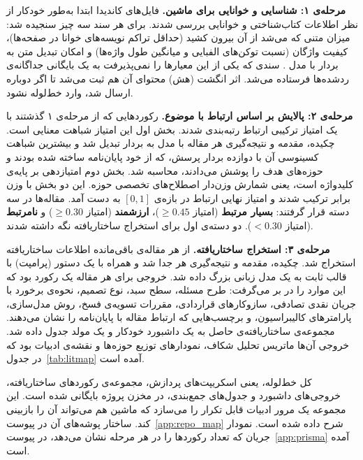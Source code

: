 \medskip
\textbf{مرحله‌ی ۱: شناسایی و خوانایی برای ماشین.}\;
فایل‌های  کاندیدا ابتدا به‌طور خودکار از نظر اطلاعات
کتاب‌شناختی و خوانایی بررسی شدند.
برای هر سند سه چیز سنجیده شد: میزان متنی که می‌شد از آن بیرون کشید
(حداقل تراکم نویسه‌های خوانا در صفحه‌ها)، کیفیت واژگان (نسبت
توکن‌های الفبایی و میانگین طول واژه‌ها) و امکان تبدیل متن به بردار
با مدل .
سندی که یکی از این معیارها را نمی‌پذیرفت به یک بایگانی جداگانه‌ی
ردشده‌ها فرستاده می‌شد. اثر انگشت (هش) محتوای آن هم ثبت می‌شد تا
اگر دوباره ارسال شد، وارد خط‌لوله نشود.

\medskip
\textbf{مرحله‌ی ۲: پالایش بر اساس ارتباط با موضوع.}\;
رکوردهایی که از مرحله‌ی ۱ گذشتند با یک امتیاز ترکیبی ارتباط
رتبه‌بندی شدند.
بخش اول این امتیاز شباهت معنایی است. چکیده، مقدمه و نتیجه‌گیری هر
مقاله با مدل  به بردار تبدیل شد و
بیشترین شباهت کسینوسی آن با دوازده بردار پرسش، که از خود پایان‌نامه
ساخته شده بودند و حوزه‌های هدف را پوشش می‌دادند، محاسبه شد.
بخش دوم امتیازدهی بر پایه‌ی کلیدواژه است، یعنی شمارش وزن‌دار
اصطلاح‌های تخصصی حوزه.
این دو بخش با وزن برابر ترکیب شدند و امتیاز نهایی ارتباط در بازه‌ی
$[0,1]$ به دست آمد.
مقاله‌ها در سه دسته قرار گرفتند: \textbf{بسیار مرتبط} (امتیاز
$\geq 0.45$)، \textbf{ارزشمند} (امتیاز $\geq 0.30$) و \textbf{نامرتبط}
(امتیاز $< 0.30$). دو دسته‌ی اول برای استخراج ساختاریافته نگه داشته
شدند.

\medskip
\textbf{مرحله‌ی ۳: استخراج ساختاریافته.}\;
از هر مقاله‌ی باقی‌مانده اطلاعات ساختاریافته استخراج شد.
چکیده، مقدمه و نتیجه‌گیری هر  جدا شد و همراه با یک دستور
(پرامپت) با قالب ثابت به یک مدل زبانی بزرگ داده شد.
خروجی برای هر مقاله یک رکورد بود که این موارد را در بر می‌گرفت:
طرح مسئله، سطح سبد، نوع تصمیم، نحوه‌ی برخورد با جریان نقدی تصادفی،
سازوکارهای قراردادی، مقررات تسویه‌ی فسخ، روش مدل‌سازی، پارامترهای
کالیبراسیون، و برچسب‌هایی که ارتباط مقاله با پایان‌نامه را نشان
می‌دهند.
مجموعه‌ی ساختاریافته‌ی حاصل به یک داشبورد خودکار و یک مولد جدول
داده شد. خروجی آن‌ها ماتریس تحلیل شکاف، نمودارهای توزیع حوزه‌ها و
نقشه‌ی ادبیات بود که در جدول~\ref{tab:litmap} آمده است.

\medskip
کل خط‌لوله، یعنی اسکریپت‌های پردازش، مجموعه‌ی رکوردهای ساختاریافته،
خروجی‌های داشبورد و جدول‌های جمع‌بندی، در مخزن پروژه بایگانی شده
است. این مجموعه یک مرور ادبیات قابل تکرار را می‌سازد که ماشین هم
می‌تواند آن را بازبینی کند. ساختار پوشه‌های آن در
پیوست~\ref{app:repo_map} شرح داده شده است.
نمودار جریان  که تعداد رکوردها را در هر مرحله نشان
می‌دهد، در پیوست~\ref{app:prisma} آمده است.


